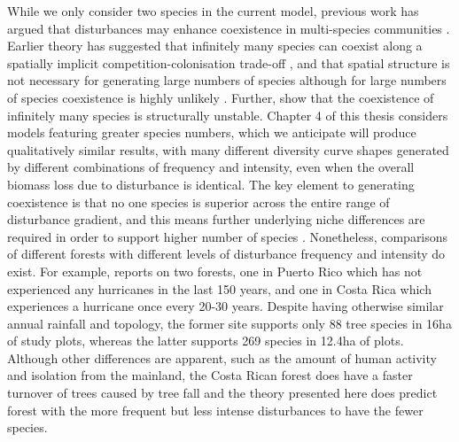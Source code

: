 While we only consider two species in the current model, previous work has argued that disturbances may enhance coexistence in multi-species communities \citep[e.g.][]{loehle2000strategy,roxburgh2004intermediate}. Earlier theory has suggested that infinitely many species can coexist along a spatially implicit competition-colonisation trade-off \citep[e.g.][]{tilman1994competition}, and that spatial structure is not necessary for generating large numbers of species \citep{adler2000space} although for large numbers of species coexistence is highly unlikely \citep[Chapter~1;][]{nattrass2012quantifying}. Further, \cite{gyllenberg2005impossibility} show that the coexistence of infinitely many species is structurally unstable. Chapter 4 of this thesis considers models featuring greater species numbers, which we anticipate will produce qualitatively similar results, with many different diversity curve shapes generated by different combinations of frequency and intensity, even when the overall biomass loss due to disturbance is identical. The key element to generating coexistence is that no one species is superior across the entire range of disturbance gradient, and this means further underlying niche differences are required in order to support higher number of species \citep[e.g.][]{seifan2013beyond}. Nonetheless, comparisons of different forests with different levels of disturbance frequency and intensity do exist. For example, \cite{denslow1987tropical} reports on two forests, one in Puerto Rico which has not experienced any hurricanes in the last 150 years, and one in Costa Rica which experiences a hurricane once every 20-30 years. Despite having otherwise similar annual rainfall and topology, the former site supports only 88 tree species in 16ha of study plots, whereas the latter supports 269 species in 12.4ha of plots. Although other differences are apparent, such as the amount of human activity and isolation from the mainland, the Costa Rican forest does have a faster turnover of trees caused by tree fall and the theory presented here does predict forest with the more frequent but less intense disturbances to have the fewer species.

